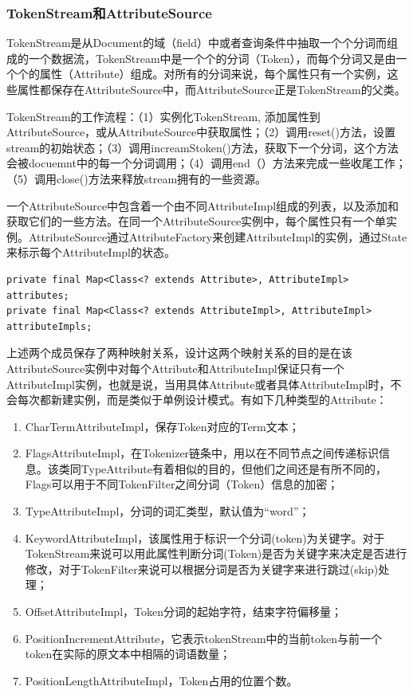 \subsubsection{TokenStream和AttributeSource}
\par TokenStream是从Document的域（field）中或者查询条件中抽取一个个分词而组成的一个数据流，TokenStream中是一个个的分词（Token），而每个分词又是由一个个的属性（Attribute）组成。对所有的分词来说，每个属性只有一个实例，这些属性都保存在AttributeSource中，而AttributeSource正是TokenStream的父类。
\par TokenStream的工作流程：（1）实例化TokenStream, 添加属性到AttributeSource，或从AttributeSource中获取属性；（2）调用reset()方法，设置stream的初始状态；（3）调用increamStoken()方法，获取下一个分词，这个方法会被docuemnt中的每一个分词调用；（4）调用end（）方法来完成一些收尾工作；（5）调用close()方法来释放stream拥有的一些资源。
\par 一个AttributeSource中包含着一个由不同AttributeImpl组成的列表，以及添加和获取它们的一些方法。在同一个AttributeSource实例中，每个属性只有一个单实例。AttributeSource通过AttributeFactory来创建AttributeImpl的实例，通过State来标示每个AttributeImpl的状态。
\begin{verbatim}
private final Map<Class<? extends Attribute>, AttributeImpl> attributes;
private final Map<Class<? extends AttributeImpl>, AttributeImpl> attributeImpls;
\end{verbatim}
\par 上述两个成员保存了两种映射关系，设计这两个映射关系的目的是在该AttributeSource实例中对每个Attribute和AttributeImpl保证只有一个AttributeImpl实例，也就是说，当用具体Attribute或者具体AttributeImpl时，不会每次都新建实例，而是类似于单例设计模式。有如下几种类型的Attribute：
\begin{enumerate}[(1)]
\item CharTermAttributeImpl，保存Token对应的Term文本；
\item FlagsAttributeImpl，在Tokenizer链条中，用以在不同节点之间传递标识信息。该类同TypeAttribute有着相似的目的，但他们之间还是有所不同的，Flags可以用于不同TokenFilter之间分词（Token）信息的加密；
\item TypeAttributeImpl，分词的词汇类型，默认值为“word”；
\item KeywordAttributeImpl，该属性用于标识一个分词(token)为关键字。对于TokenStream来说可以用此属性判断分词(Token)是否为关键字来决定是否进行修改，对于TokenFilter来说可以根据分词是否为关键字来进行跳过(skip)处理；
\item OffsetAttributeImpl，Token分词的起始字符，结束字符偏移量； 
\item PositionIncrementAttribute，它表示tokenStream中的当前token与前一个token在实际的原文本中相隔的词语数量；
\item PositionLengthAttributeImpl，Token占用的位置个数。
\end{enumerate}
